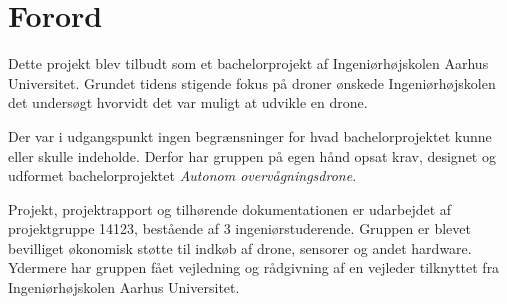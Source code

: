 \chapter{Forord}

Dette projekt blev tilbudt som et bachelorprojekt af Ingeniørhøjskolen Aarhus Universitet. Grundet tidens stigende fokus på droner ønskede Ingeniørhøjskolen det undersøgt hvorvidt det var muligt at udvikle en drone.

Der var i udgangspunkt ingen begrænsninger for hvad bachelorprojektet kunne eller skulle indeholde. Derfor har gruppen på egen hånd opsat krav, designet og udformet bachelorprojektet \textit{Autonom overvågningsdrone}.
 
Projekt, projektrapport og tilhørende dokumentationen er udarbejdet af projektgruppe 14123, bestående af 3 ingeniørstuderende. Gruppen er blevet bevilliget økonomisk støtte til indkøb af drone, sensorer og andet hardware. Ydermere har gruppen fået vejledning og rådgivning af en vejleder tilknyttet fra Ingeniørhøjskolen Aarhus Universitet.  